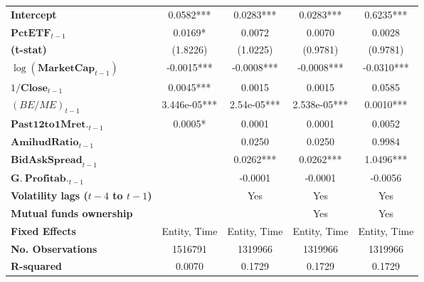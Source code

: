 {\begin{longtable}{>{\bfseries}lcccc}
Intercept                &       0.0582***       &             0.0283***            &             0.0283***            &         0.6235***         \\
\rowcolor{blue!20}
$\mathbf{PctETF}_{t-1}$            &       0.0169*      &             0.0072            &             0.0070            &         0.0028         \\
(t-stat)                                &      (1.8226)      &            (1.0225)           &            (0.9781)           &        (0.9781)        \\
$\log(\mathbf{MarketCap}_{t-1})$    &      -0.0015***       &            -0.0008***            &            -0.0008***          &        -0.0310***         \\
$1/\mathbf{Close}_{t-1}$                    &       0.0045***       &             0.0015            &             0.0015            &         0.0585         \\
$\left(BE/ME\right)_{t-1}$      &     3.446e-05***      &            2.54e-05***           &           2.538e-05***           &         0.0010***         \\
$\mathbf{Past 12 to 1M ret.}_{t-1}$       &       0.0005*       &             0.0001            &             0.0001            &         0.0052         \\
$\mathbf{AmihudRatio}_{t-1}$       &                    &             0.0250            &             0.0250            &         0.9984         \\
$\mathbf{BidAskSpread}_{t-1}$            &                    &             0.0262***            &             0.0262***            &         1.0496***         \\
$\mathbf{G.~Profitab.}_{t-1}$      &                    &            -0.0001            &            -0.0001            &        -0.0056         \\
Volatility lags ($t - 4$ to $t - 1$) & & Yes & Yes & Yes\\
Mutual funds ownership &  &  & Yes  & Yes\\
\midrule
Fixed Effects   &     Entity, Time       &        Entity, Time             &            Entity, Time          &       Entity, Time  \\
\bottomrule
\toprule
\textbf{No. Observations}                  &      1516791       &            1319966            &            1319966            &        1319966         \\
\textbf{R-squared}                         &       0.0070       &             0.1729            &             0.1729            &         0.1729         \\

\end{longtable}}
